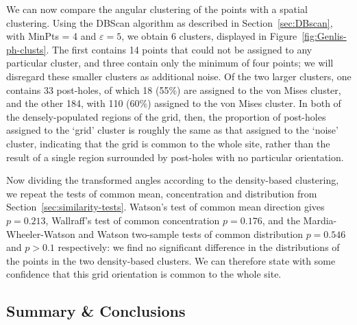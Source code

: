 \documentclass[../../ArchStats.tex]{subfiles}
\begin{document}
We can now compare the angular clustering of the points with a spatial clustering. Using the DBScan algorithm as described in Section~\ref{sec:DBscan}, with MinPts = 4 and $\varepsilon = 5$, we obtain 6 clusters, displayed in Figure~\ref{fig:Genlis-ph-clusts}. The first contains 14 points that could not be assigned to any particular cluster, and three contain only the minimum of four points; we will disregard these smaller clusters as additional noise. Of the two larger clusters, one contains 33 post-holes, of which 18 (55\%) are assigned to the von Mises cluster, and the other 184, with 110 (60\%) assigned to the von Mises cluster. In both of the densely-populated regions of the grid, then, the proportion of post-holes assigned to the `grid' cluster is roughly the same as that assigned to the `noise' cluster, indicating that the grid is common to the whole site, rather than the result of a single region surrounded by post-holes with no particular orientation.

Now dividing the transformed angles according to the density-based clustering, we repeat the tests of common mean, concentration and distribution from Section~\ref{sec:similarity-tests}. Watson's test of common mean direction gives $p= 0.213$, Wallraff's test of common concentration $p=0.176$, and the Mardia-Wheeler-Watson and Watson two-sample tests of common distribution $p = 0.546$ and $p > 0.1$ respectively: we find no significant difference in the distributions of the points in the two density-based clusters. We can therefore state with some confidence that this grid orientation is common to the whole site.






\subsection{Summary \& Conclusions}
\end{document}
